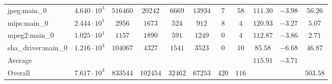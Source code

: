 \begin{tabular}{|l|c|c|c|c|c|c|c|c|c|c|}
jpeg:main\_0            & $ 4.640 \cdot 10^{3} $ & $ 516460 $ & $ 20242  $ & $ 6669  $ & $ 13934 $ & $ 7   $ & $ 58  $ & $ 111.30      $ & $ -3.98   $ & $ 56.26   $ \\
mips:main\_0            & $ 2.444 \cdot 10^{1} $ & $ 2956   $ & $ 1673   $ & $ 524   $ & $ 912   $ & $ 8   $ & $ 4   $ & $ 120.93      $ & $ -3.27   $ & $ 5.07    $ \\
mpeg2:main\_0           & $ 1.025 \cdot 10^{1} $ & $ 1157   $ & $ 1890   $ & $ 591   $ & $ 1249  $ & $ 0   $ & $ 4   $ & $ 112.87      $ & $ -3.86   $ & $ 2.71    $ \\
sha\_driver:main\_0     & $ 1.216 \cdot 10^{3} $ & $ 104067 $ & $ 4327   $ & $ 1541  $ & $ 3523  $ & $ 0   $ & $ 10  $ & $ 85.58       $ & $ -6.68   $ & $ 46.87   $ \\
\hline
Average                 & $                    $ & $        $ & $        $ & $       $ & $       $ & $     $ & $     $ & $ 115.91      $ & $ -3.71   $ & $         $ \\
\hline
Overall                 & $ 7.617 \cdot 10^{3} $ & $ 833544 $ & $ 102454 $ & $ 32462 $ & $ 67253 $ & $ 420 $ & $ 116 $ & $             $ & $         $ & $ 503.58  $ \\
\hline
\end{tabular}

